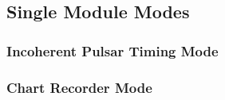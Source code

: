 \subsection{Single Module Modes}
\subsubsection{Incoherent Pulsar Timing Mode}
\subsubsection{Chart Recorder Mode}

